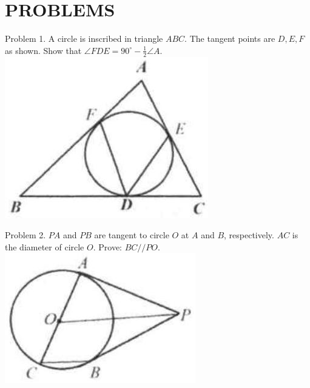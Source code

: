 \documentclass[10pt]{article}
\begin{document}
\section*{PROBLEMS}
Problem 1. A circle is inscribed in triangle \(A B C\). The tangent points are \(D, E, F\) as shown. Show that \(\angle F D E=90^{\circ}-\frac{1}{2} \angle A\).\\
\includegraphics[max width=\textwidth, center]{2025_04_17_97bc1f7e44d93c271a88g-154(1)}

Problem 2. \(P A\) and \(P B\) are tangent to circle \(O\) at \(A\) and \(B\), respectively. \(A C\) is the diameter of circle \(O\). Prove: \(B C / / P O\).\\
\includegraphics[max width=\textwidth, center]{2025_04_17_97bc1f7e44d93c271a88g-154(2)}
\end{document}
